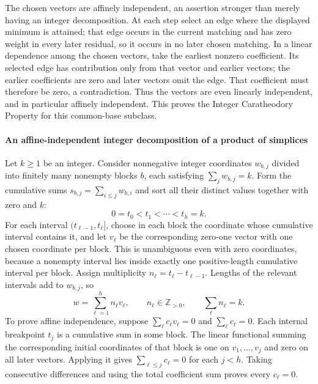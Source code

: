 \documentclass[11pt]{article}
\begin{document}
The chosen vectors are affinely independent, an assertion stronger than merely having an integer decomposition. At each step select an edge where the displayed minimum is attained; that edge occurs in the current matching and has zero weight in every later residual, so it occurs in no later chosen matching. In a linear dependence among the chosen vectors, take the earliest nonzero coefficient. Its selected edge has contribution only from that vector and earlier vectors; the earlier coefficients are zero and later vectors omit the edge. That coefficient must therefore be zero, a contradiction. Thus the vectors are even linearly independent, and in particular affinely independent. This proves the Integer Caratheodory Property for this common-base subclass.

\paragraph{An affine-independent integer decomposition of a product of simplices}
Let $k\geq1$ be an integer. Consider nonnegative integer coordinates $w_{b,j}$ divided into finitely many nonempty blocks $b$, each satisfying $\sum_jw_{b,j}=k$. Form the cumulative sums $s_{b,j}=\sum_{i\leq j}w_{b,i}$ and sort all their distinct values together with zero and $k$:
\[
 0=t_0<t_1<\cdots<t_h=k.
\]
For each interval $(t_{\ell-1},t_\ell]$, choose in each block the coordinate whose cumulative interval contains it, and let $v_\ell$ be the corresponding zero-one vector with one chosen coordinate per block. This is unambiguous even with zero coordinates, because a nonempty interval lies inside exactly one positive-length cumulative interval per block. Assign multiplicity $n_\ell=t_\ell-t_{\ell-1}$. Lengths of the relevant intervals add to $w_{b,j}$, so
\[
 w=\sum_{\ell=1}^h n_\ell v_\ell,\qquad
 n_\ell\in\mathbb Z_{>0},\qquad\sum_\ell n_\ell=k.
\]
To prove affine independence, suppose $\sum_\ell c_\ell v_\ell=0$ and $\sum_\ell c_\ell=0$. Each internal breakpoint $t_j$ is a cumulative sum in some block. The linear functional summing the corresponding initial coordinates of that block is one on $v_1,\ldots,v_j$ and zero on all later vectors. Applying it gives $\sum_{\ell\leq j}c_\ell=0$ for each $j<h$. Taking consecutive differences and using the total coefficient sum proves every $c_\ell=0$.
\end{document}
